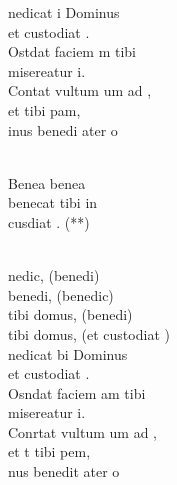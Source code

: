 \documentclass[12pt]{article}
\begin{document}
\begin{multicols*}{2}
\begin{cancion}[Benedicat][]%
	nedicat i Dominus \\
	et custodiat .\\
	Ostdat faciem m tibi\\
	 misereatur i.\\
	Contat vultum um ad ,\\
	et  tibi pam,\\
	inus benedi ater o \\\jump\\
	\begin{chorus}%
	Benea     benea \\
	benecat tibi in\\
	 cusdiat . (**)\\
	\end{chorus}%
	\jump\\
	nedic, (benedi)\\
	benedi, (benedic)\\
	tibi domus, (benedi)\\
	tibi domus, (et custodiat )\\
	nedicat bi Dominus\\
	et custodiat .\\
	Osndat faciem am tibi\\
	 misereatur i.\\
	Conrtat vultum um ad ,\\
	et t tibi pem,\\
	nus benedit ater o \\\jump\\
	\begin{chorus}%

\end{chorus}
\end{cancion}
\end{multicols*}
\end{document}
